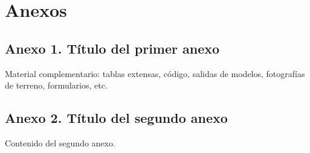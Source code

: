 %
%

\chapter{Anexos}

\section{Anexo 1. Título del primer anexo}

Material complementario: tablas extensas, código, salidas de modelos,
fotografías de terreno, formularios, etc.

\section{Anexo 2. Título del segundo anexo}

Contenido del segundo anexo.
